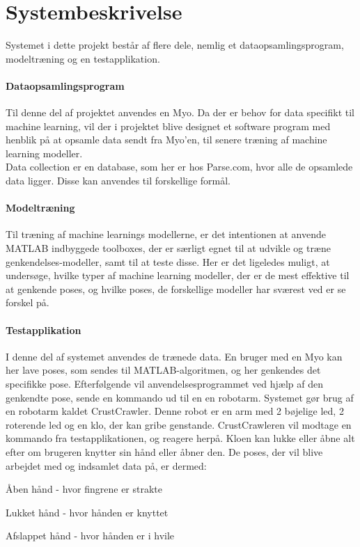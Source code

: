 \thispagestyle{fancy}
\chapter{Systembeskrivelse}
\label{chp:systembeskrivelse}

Systemet i dette projekt består af flere dele, nemlig et dataopsamlingsprogram, modeltræning og en testapplikation.
\subsubsection{Dataopsamlingsprogram}
Til denne del af projektet anvendes en Myo.
Da der er behov for data specifikt til machine learning, vil der i projektet blive designet et software program med henblik på at opsamle data sendt fra Myo'en, til senere træning af machine learning modeller.\\
Data collection er en database, som her er hos Parse.com\citep{RefWorks:11}, hvor alle de opsamlede data ligger. Disse kan anvendes til forskellige formål.

\subsubsection{Modeltræning}
Til træning af machine learnings modellerne, er det intentionen at anvende MATLAB indbyggede toolboxes, der er særligt egnet til at udvikle og træne genkendelses-modeller, samt til at teste disse. 
Her er det ligeledes muligt, at undersøge, hvilke typer af machine learning modeller, der er de mest effektive til at genkende poses, og hvilke poses, de forskellige modeller har sværest ved er se forskel på.

\subsubsection{Testapplikation}
I denne del af systemet anvendes de trænede data. En bruger med en Myo kan her lave poses, som sendes til MATLAB-algoritmen, og her genkendes det specifikke pose. Efterfølgende vil anvendelsesprogrammet ved hjælp af den genkendte pose, sende en kommando ud til en en robotarm. Systemet gør brug af en robotarm kaldet CrustCrawler. Denne robot er en arm med 2 bøjelige led, 2 roterende led og en klo, der kan gribe genstande. CrustCrawleren vil modtage en kommando fra testapplikationen, og reagere herpå. Kloen kan lukke eller åbne alt efter om brugeren knytter sin hånd eller åbner den. De poses, der vil blive arbejdet med og indsamlet data på, er dermed:
\begin{myItemize}
	\item Åben hånd - hvor fingrene er strakte
	\item Lukket hånd - hvor hånden er knyttet
	\item Afslappet hånd - hvor hånden er i hvile
\end{myItemize}


